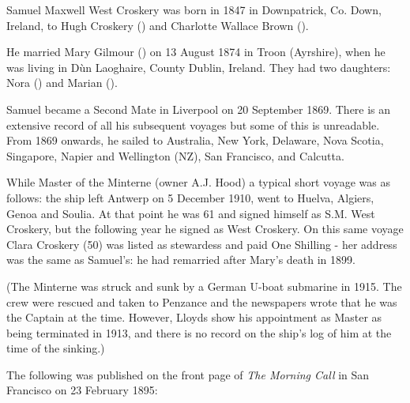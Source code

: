 
Samuel Maxwell West Croskery was born in 1847 in Downpatrick, Co. Down, Ireland, to Hugh Croskery () and Charlotte Wallace Brown ().\cite{SMWC-MG-marriage}

He married Mary Gilmour () on 13 August 1874 in Troon (Ayrshire), when he was living in D\`{u}n Laoghaire, County Dublin, Ireland.\cite{SMWC-MG-marriage} They had two daughters: Nora () and Marian ().

Samuel became a Second Mate in Liverpool on 20 September 1869. There is an extensive record of all his subsequent voyages but some of this is unreadable.\cite{MarineRecordsSMWC} From 1869 onwards, he sailed to Australia, New York, Delaware, Nova Scotia, Singapore, Napier and Wellington (NZ), San Francisco, and Calcutta.

While Master of the Minterne (owner A.J. Hood) a typical short voyage was as follows: the ship left Antwerp on 5 December 1910, went to Huelva, Algiers, Genoa and Soulia. At that point he was 61 and signed himself as S.M. West Croskery, but the following year he signed as West Croskery. On this same voyage Clara Croskery (50) was listed as stewardess and paid One Shilling - her address was the same as Samuel's: he had remarried after Mary's death in 1899.

(The Minterne was struck and sunk by a German U-boat submarine in 1915.  The crew were rescued and taken to Penzance and the newspapers wrote that he was the Captain at the time. However, Lloyds show his appointment as Master as being terminated in 1913, and there is no record on the ship's log of him at the time of the sinking.)

The following was published on the front page of \emph{The Morning Call} in San Francisco on 23 February 1895:

